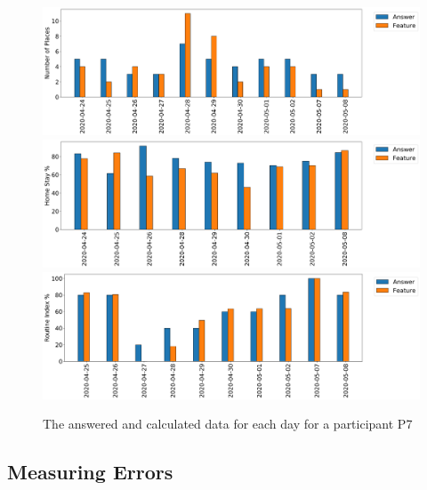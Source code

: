 \begin{figure}
    \centering
    \includegraphics[width=\textwidth]{images/study/places_ec110976-0192-436d-b451-4f5dd97e71d8.png}
    \includegraphics[width=\textwidth]{images/study/homestay_ec110976-0192-436d-b451-4f5dd97e71d8.png}
    \includegraphics[width=\textwidth]{images/study/routine_ec110976-0192-436d-b451-4f5dd97e71d8.png}
    \caption{The answered and calculated data for each day for a participant P7}
    \label{fig:plot-participant-features}
\end{figure}
\subsection{Measuring Errors}

